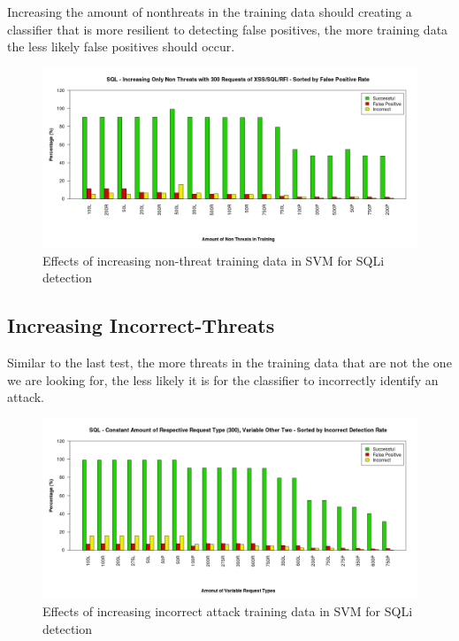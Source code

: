 Increasing the amount of nonthreats in the training data should creating a classifier that is more resilient to detecting false positives, the more training data the less likely false positives should occur.

\begin{figure}
	\label{fig:resFalse}
	\includegraphics[width=450px]{./assets/results/svm/nonthreat/Results_SQL.png}
	\caption{Effects of increasing non-threat training data in SVM for SQLi detection}
\end{figure}

\subsection{Increasing Incorrect-Threats}

Similar to the last test, the more threats in the training data that are not the one we are looking for, the less likely it is for the classifier to incorrectly identify an attack.

\begin{figure}
	\label{fig:resIncorrect}
	\includegraphics[width=450px]{./assets/results/svm/incorrect/Results_SQL.png}
	\caption{Effects of increasing incorrect attack training data in SVM for SQLi detection}
\end{figure}



